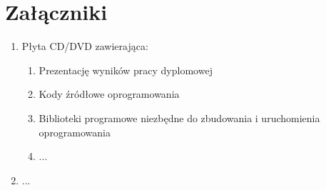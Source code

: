 \clearpage

\listoffigures
{}

\listoftables
{}

\clearpage \section*{Załączniki}
\begin{enumerate}
    \item Płyta CD/DVD zawierająca:
    \begin{enumerate}
        \item Prezentację wyników pracy dyplomowej
        \item Kody źródłowe oprogramowania
        \item Biblioteki programowe niezbędne do zbudowania i uruchomienia oprogramowania
        \item ...
    \end{enumerate}
    \item ...
\end{enumerate}

